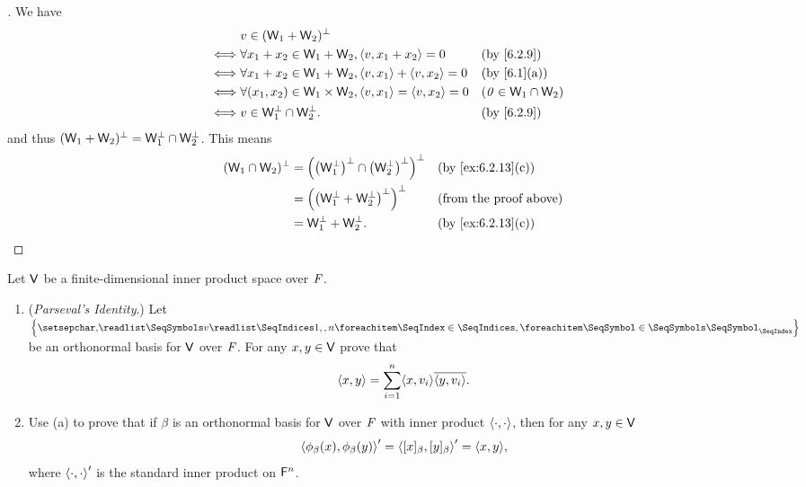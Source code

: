 \begin{proof}[]
	We have
	\begin{align*}
		     & v \in (\W_1 + \W_2)^{\perp}                                                                            \\
		\iff & \forall x_1 + x_2 \in \W_1 + \W_2, \inn{v, x_1 + x_2} = 0                &  & \by{6.2.9}               \\
		\iff & \forall x_1 + x_2 \in \W_1 + \W_2, \inn{v, x_1} + \inn{v, x_2} = 0       &  & \by{6.1}[a]              \\
		\iff & \forall (x_1, x_2) \in \W_1 \times \W_2, \inn{v, x_1} = \inn{v, x_2} = 0 &  & (\zv \in \W_1 \cap \W_2) \\
		\iff & v \in \W_1^{\perp} \cap \W_2^{\perp}.                                    &  & \by{6.2.9}
	\end{align*}
	and thus \((\mathsf{W}_1 + \mathsf{W}_2)^{\perp} = \mathsf{W}_1^{\perp} \cap \mathsf{W}_2^{\perp}\).
	This means
	\begin{align*}
		(\W_1 \cap \W_2)^{\perp} & = \pa{\pa{\W_1^{\perp}}^{\perp} \cap \pa{\W_2^{\perp}}^{\perp}}^{\perp} &  & \by{ex:6.2.13}[c]             \\
		                         & = \pa{\pa{\W_1^{\perp} + \W_2^{\perp}}^{\perp}}^{\perp}                 &  & \text{(from the proof above)} \\
		                         & = \W_1^{\perp} + \W_2^{\perp}.                                          &  & \by{ex:6.2.13}[c]
	\end{align*}
\end{proof}

\begin{ex}\label{ex:6.2.15}
	Let \(\mathsf{V}\) be a finite-dimensional inner product space over \(\mathit{F}\).
	\begin{enumerate}
		\item (\emph{Parseval's Identity}.)
		      Let \(\set{\seq{v}{1,,n}}\) be an orthonormal basis for \(\mathsf{V}\) over \(\mathit{F}\).
		      For any \(x, y \in \mathsf{V}\) prove that
		      \[
			      \inn{x, y} = \sum_{i = 1}^n \inn{x, v_i} \conj{\inn{y, v_i}}.
		      \]
		\item Use (a) to prove that if \(\beta\) is an orthonormal basis for \(\mathsf{V}\) over \(\mathit{F}\) with inner product \(\left\langle\cdot, \cdot\right\rangle\), then for any \(x, y \in \mathsf{V}\)
		      \[
			      \inn{\phi_{\beta}(x), \phi_{\beta}(y)}' = \inn{[x]_{\beta}, [y]_{\beta}}' = \inn{x, y},
		      \]
		      where \(\left\langle\cdot, \cdot\right\rangle'\) is the standard inner product on \(\mathsf{F}^n\).
	\end{enumerate}
\end{ex}

